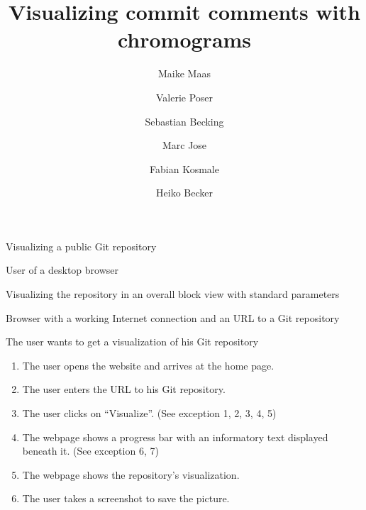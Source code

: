 \documentclass[11pt]{scrartcl}
\author{Maike Maas \and Valerie Poser \and Sebastian Becking \and
        Marc Jose \and Fabian Kosmale \and Heiko Becker}
\title{Visualizing commit comments with chromograms}
\begin{document}
\maketitle

\begin{description}[leftmargin=!,labelwidth=\widthof{\bfseries Frequency of use:}]
	\item[Use-case:] Visualizing a public Git repository 
	\item[Primary actor:] User of a desktop browser 
	\item[Goal in context:] Visualizing the repository in an overall block view with standard parameters 
	\item[Preconditions:] Browser with a working Internet connection and an URL to a Git repository
	\item[Trigger:] The user wants to get a visualization of his Git repository 

	\item[Scenario:]
		\begin{enumerate}[leftmargin=1.5em]
			\item The user opens the website and arrives at the home page.
			\item The user enters the URL to his Git repository. 
			\item The user clicks on \enquote{Visualize}. (See exception 1, 2, 3, 4, 5)
			\item The webpage shows a progress bar with an
				informatory text displayed beneath
				it. (See exception 6, 7)
			\item The webpage shows the repository's visualization.
			\item The user takes a screenshot to save the picture. 
		\end{enumerate}


\end{description}
\end{document}
